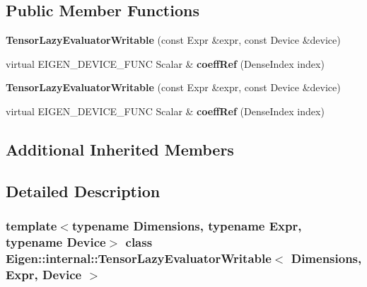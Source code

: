 \subsection*{Public Member Functions}
\begin{DoxyCompactItemize}
\item 
\mbox{\label{class_eigen_1_1internal_1_1_tensor_lazy_evaluator_writable_aa28368e149d876626ffb4336330d45e9}} 
{\bfseries Tensor\+Lazy\+Evaluator\+Writable} (const Expr \&expr, const Device \&device)
\item 
\mbox{\label{class_eigen_1_1internal_1_1_tensor_lazy_evaluator_writable_a853559ea59f6a4e31fb08e0240c14461}} 
virtual E\+I\+G\+E\+N\+\_\+\+D\+E\+V\+I\+C\+E\+\_\+\+F\+U\+NC Scalar \& {\bfseries coeff\+Ref} (Dense\+Index index)
\item 
\mbox{\label{class_eigen_1_1internal_1_1_tensor_lazy_evaluator_writable_aa28368e149d876626ffb4336330d45e9}} 
{\bfseries Tensor\+Lazy\+Evaluator\+Writable} (const Expr \&expr, const Device \&device)
\item 
\mbox{\label{class_eigen_1_1internal_1_1_tensor_lazy_evaluator_writable_a853559ea59f6a4e31fb08e0240c14461}} 
virtual E\+I\+G\+E\+N\+\_\+\+D\+E\+V\+I\+C\+E\+\_\+\+F\+U\+NC Scalar \& {\bfseries coeff\+Ref} (Dense\+Index index)
\end{DoxyCompactItemize}
\subsection*{Additional Inherited Members}


\subsection{Detailed Description}
\subsubsection*{template$<$typename Dimensions, typename Expr, typename Device$>$\newline
class Eigen\+::internal\+::\+Tensor\+Lazy\+Evaluator\+Writable$<$ Dimensions, Expr, Device $>$}

